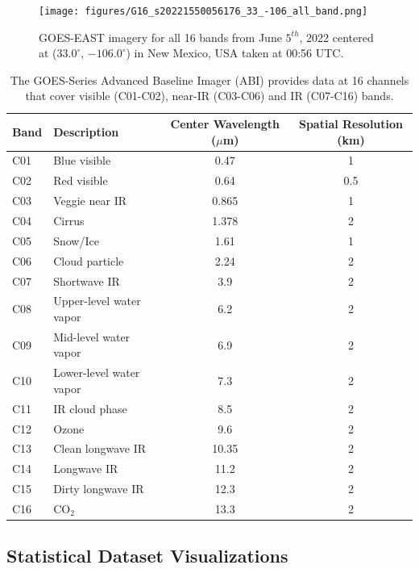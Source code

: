 \documentclass{article}
\begin{document}
\begin{figure}[!htb]
    \centering
    \texttt{[image: figures/G16\_s20221550056176\_33\_-106\_all\_band.png]}
    \caption{GOES-EAST imagery for all 16 bands from June \(5^{th}\), 2022 centered at (\(33.0^{\circ}\), \(-106.0^{\circ}\)) in New Mexico, USA taken at 00:56 UTC.}\label{all_bands}
\end{figure}

\begin{table}[!htb]
\centering
\caption{The GOES-Series Advanced Baseline Imager (ABI) provides data at 16 channels that cover visible (C01-C02), near-IR (C03-C06) and IR (C07-C16) bands.}
\begin{tabular}{llcc}
\toprule
\textbf{Band} & \textbf{Description} & \textbf{Center Wavelength (\(\mu\)m)} & \textbf{Spatial Resolution (km)} \\
\midrule
C01  & Blue visible                & 0.47     & 1   \\
C02  & Red visible                 & 0.64     & 0.5 \\
C03  & Veggie near IR             & 0.865    & 1   \\
C04  & Cirrus                     & 1.378    & 2   \\
C05  & Snow/Ice                   & 1.61     & 1   \\
C06  & Cloud particle             & 2.24     & 2   \\
C07  & Shortwave IR               & 3.9      & 2   \\
C08  & Upper-level water vapor    & 6.2      & 2   \\
C09  & Mid-level water vapor      & 6.9      & 2   \\
C10  & Lower-level water vapor    & 7.3      & 2   \\
C11  & IR cloud phase             & 8.5      & 2   \\
C12  & Ozone                      & 9.6      & 2   \\
C13  & Clean longwave IR          & 10.35    & 2   \\
C14  & Longwave IR                & 11.2     & 2   \\
C15  & Dirty longwave IR          & 12.3     & 2   \\
C16  & CO\(_2\)                         & 13.3     & 2   \\
\bottomrule
\end{tabular}
\label{band_table}
\end{table}

\subsection{Statistical Dataset Visualizations}
\end{document}
